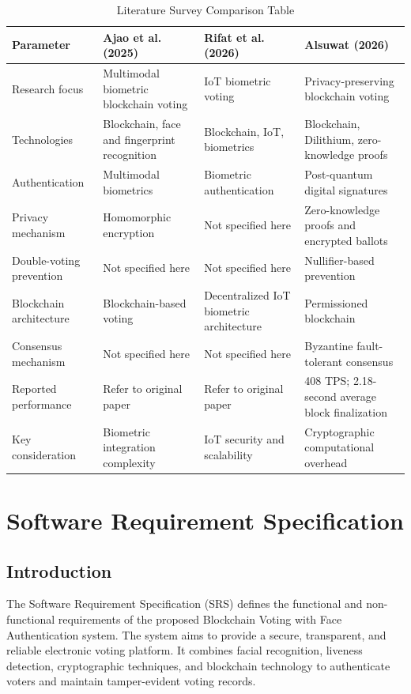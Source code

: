 \documentclass[12pt]{report}
\begin{document}
	\begin{table}[h!]
		\centering
		\small
		\renewcommand{\arraystretch}{1.6}
		\caption{Literature Survey Comparison Table}
		\vspace{0.2cm}
		\label{tab:lit_survey}
		\begin{tabular}{|p{3.2cm}|p{3.8cm}|p{3.8cm}|p{4.2cm}|}
			\hline
			\textbf{Parameter} & \textbf{Ajao et al. (2025)} & \textbf{Rifat et al. (2026)} & \textbf{Alsuwat (2026)} \\ \hline
			Research focus & Multimodal biometric blockchain voting & IoT biometric voting & Privacy-preserving blockchain voting \\ \hline
			Technologies & Blockchain, face and fingerprint recognition & Blockchain, IoT, biometrics & Blockchain, Dilithium, zero-knowledge proofs \\ \hline
			Authentication & Multimodal biometrics & Biometric authentication & Post-quantum digital signatures \\ \hline
			Privacy mechanism & Homomorphic encryption & Not specified here & Zero-knowledge proofs and encrypted ballots \\ \hline
			Double-voting prevention & Not specified here & Not specified here & Nullifier-based prevention \\ \hline
			Blockchain architecture & Blockchain-based voting & Decentralized IoT biometric architecture & Permissioned blockchain \\ \hline
			Consensus mechanism & Not specified here & Not specified here & Byzantine fault-tolerant consensus \\ \hline
			Reported performance & Refer to original paper & Refer to original paper & 408 TPS; 2.18-second average block finalization \\ \hline
			Key consideration & Biometric integration complexity & IoT security and scalability & Cryptographic computational overhead \\ \hline
		\end{tabular}
	\end{table}
	
	\newpage
	
	\chapter{Software Requirement Specification}
	
	\section{Introduction}
	The Software Requirement Specification (SRS) defines the functional and non-functional requirements of the proposed Blockchain Voting with Face Authentication system. The system aims to provide a secure, transparent, and reliable electronic voting platform. It combines facial recognition, liveness detection, cryptographic techniques, and blockchain technology to authenticate voters and maintain tamper-evident voting records.
	
\end{document}
